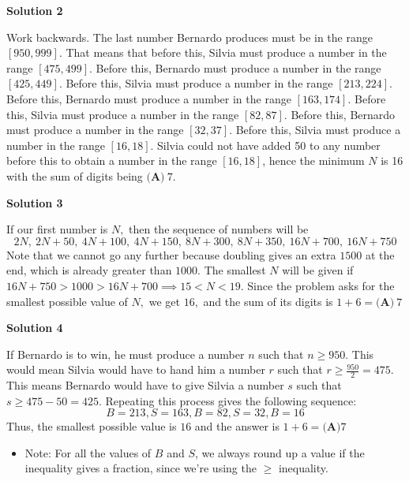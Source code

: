 \begin{enumerate}
 



\textbf{Solution 2}

Work backwards. The last number Bernardo produces must be in the range $[950,999]$. That means that before this, Silvia must produce a number in the range $[475,499]$. Before this, Bernardo must produce a number in the range $[425,449]$. Before this, Silvia must produce a number in the range $[213,224]$. Before this, Bernardo must produce a number in the range $[163,174]$. Before this, Silvia must produce a number in the range $[82,87]$. Before this, Bernardo must produce a number in the range $[32,37]$. Before this, Silvia must produce a number in the range $[16,18]$. Silvia could not have added 50 to any number before this to obtain a number in the range $[16,18]$, hence the minimum $N$ is 16 with the sum of digits being $\boxed{\textbf{(A)}\ 7}$.

 



\textbf{Solution 3}

If our first number is $N,$ then the sequence of numbers will be 
 \[2N,~2N+50,~4N+100,~4N+150,~8N+300,~8N+350,~16N+700,~16N+750\] Note that we cannot go any further because doubling gives an extra $1500$ at the end, which is already greater than $1000.$ The smallest $N$ will be given if $16N+750>1000>16N+700 \implies 15<N<19.$ Since the problem asks for the smallest possible value of $N,$ we get $16,$ and the sum of its digits is $1+6=\boxed{\textbf{(A)}~7}$




\textbf{Solution 4}

If Bernardo is to win, he must produce a number $n$ such that $n \geq 950$. This would mean Silvia would have to hand him a number $r$ such that $r \geq \frac{950}{2}=475$. This means Bernardo would have to give Silvia a number $s$ such that $s \geq 475-50=425$. Repeating this process gives the following sequence: 
 \[B=213, S=163, B=82, S=32, B=16\] Thus, the smallest possible value is $16$ and the answer is $1+6=\boxed{\textbf{(A)}7}$

            \begin{itemize}
        \item Note: For all the values of $B$ and $S$, we always round up a value if the inequality gives a fraction, since we're using the $\geq$                inequality.
            \end{itemize}
            



\end{enumerate}
